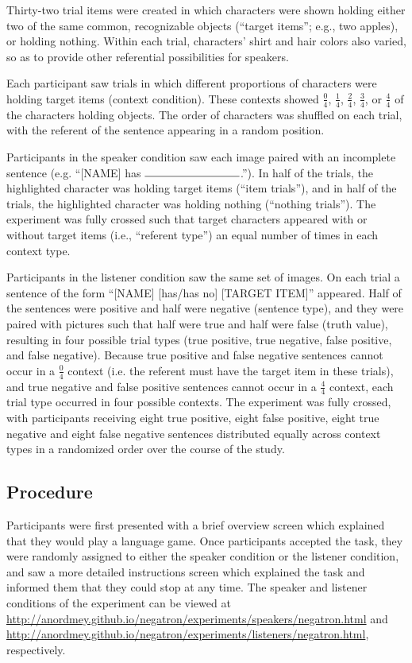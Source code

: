 \documentclass[man, noapacite]{apa2}
\begin{document}
Thirty-two trial items were created in which characters were shown holding either two of the same common, recognizable objects (``target items''; e.g., two apples), or holding nothing. Within each trial, characters' shirt and hair colors also varied, so as to provide other referential possibilities for speakers.

Each participant saw trials in which different proportions of characters were holding target items (context condition).  These contexts showed $\frac{0}{4}$, $\frac{1}{4}$, $\frac{2}{4}$, $\frac{3}{4}$, or $\frac{4}{4}$ of the characters holding objects. The order of characters was shuffled on each trial, with the referent of the sentence appearing in a random position.

Participants in the speaker condition saw each image paired with an incomplete sentence (e.g. ``[NAME] has $\rule{3cm}{0.15mm}$.''). In half of the trials, the highlighted character was holding target items (``item trials''), and in half of the trials, the highlighted character was holding nothing (``nothing trials'').  The experiment was fully crossed such that target characters appeared with or without target items (i.e., ``referent type'') an equal number of times in each context type.

Participants in the listener condition saw the same set of images.  On each trial a sentence of the form ``[NAME] [has/has no] [TARGET ITEM]'' appeared.  Half of the sentences were positive and half were negative (sentence type), and they were paired with pictures such that half were true and half were false (truth value), resulting in four possible trial types (true positive, true negative, false positive, and false negative).  Because true positive and false negative sentences cannot occur in a $\frac{0}{4}$ context (i.e. the referent must have the target item in these trials), and true negative and false positive sentences cannot occur in a $\frac{4}{4}$ context, each trial type occurred in four possible contexts.  The experiment was fully crossed, with participants receiving eight true positive, eight false positive, eight true negative and eight false negative sentences distributed equally across context types in a randomized order over the course of the study.

\subsection{Procedure}

Participants were first presented with a brief overview screen which explained that they would play a language game.  Once participants accepted the task, they were randomly assigned to either the speaker condition or the listener condition, and saw a more detailed instructions screen which explained the task and informed them that they could stop at any time. The speaker and listener conditions of the experiment can be viewed at \url{http://anordmey.github.io/negatron/experiments/speakers/negatron.html} and \url{http://anordmey.github.io/negatron/experiments/listeners/negatron.html}, respectively.
\end{document}
